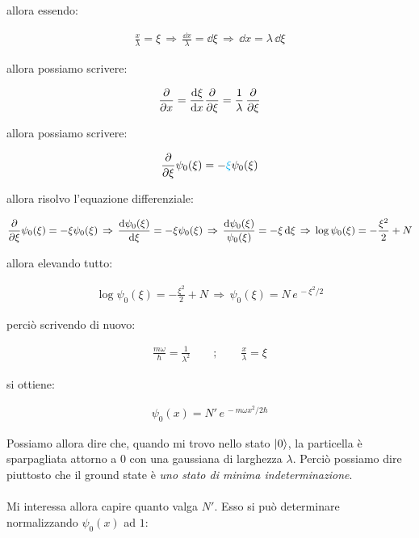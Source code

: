 	allora essendo:
	
\begin{align*}
	\frac{x}{\lambda} = \xi \, \Rightarrow \, \frac{\dd x}{ \lambda} = \dd \xi \, \Rightarrow \, \dd x = \lambda \, \dd \xi
\end{align*}

	allora possiamo scrivere:
	
\begin{align*}
	\pdv{x} = \frac{\dd \xi}{\dd x} \pdv{\xi} = \frac{1}{\lambda} \, \pdv{\xi}
\end{align*}

	allora possiamo scrivere:
	
\begin{align*}
	\pdv{\xi} \psi_0(\xi) = - \textcolor{cyan}{{\xi}} \psi_0(\xi)
\end{align*}

	allora risolvo l'equazione differenziale:

\begin{align*}
	\pdv{\xi} \psi_0(\xi) = - \xi \psi_0(\xi) \, \Rightarrow \, \frac{\dd \psi_0(\xi)}{ \dd \xi} = - \xi \psi_0(\xi) \, \Rightarrow \, \frac{\dd \psi_0(\xi)}{\psi_0(\xi) } = - \xi \, \dd \xi \, \Rightarrow \, \log \psi_0(\xi) = - \frac{\xi^2}{2} + N
\end{align*}

	allora elevando tutto:

\begin{align*}
	\log \psi_0(\xi) = - \frac{\xi^2}{2} + N \, \Rightarrow \, \psi_0(\xi) = N \, e^{\, - \xi^2/2}
\end{align*}

	perciò scrivendo di nuovo:
	
\begin{align*}
	\frac{m\omega}{\hbar} = \frac{1}{\lambda^2} \qquad ; \qquad \frac{x}{\lambda} = \xi
\end{align*}

	si ottiene:

\begin{nb}
\begin{align*}
	\psi_0(x) = N' \, e^{\, - m\omega x^2/2\hbar}
\end{align*}
\end{nb}

	Possiamo allora dire che, quando mi trovo nello stato $\ket{0}$, la particella è sparpagliata attorno a $0$ con una gaussiana di larghezza $\lambda$. Perciò possiamo dire piuttosto che il ground state è \textit{uno stato di minima indeterminazione}. 
	\\
	\\
	Mi interessa allora capire quanto valga $N'$. Esso si può determinare normalizzando $\psi_0(x)$ ad $1$:
	
